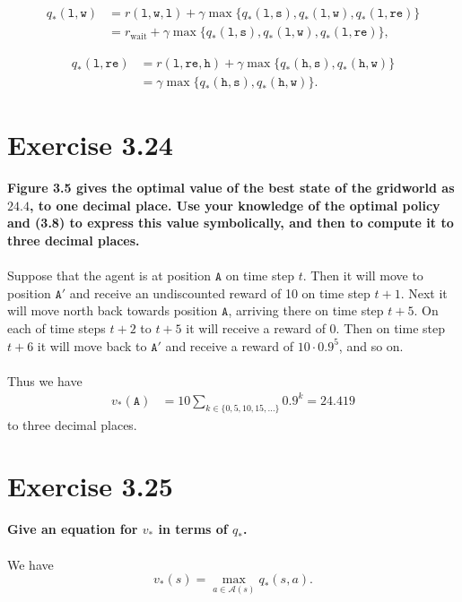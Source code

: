 \documentclass[a4paper,11pt]{article}
\numberwithin{equation}{section}
\theoremstyle{remark}
\begin{document}
\begin{align*}
	q_*(\texttt{l}, \texttt{w}) & = r(\texttt{l}, \texttt{w}, \texttt{l}) + 
	\gamma \max\{ q_*(\texttt{l}, \texttt{s}), q_*(\texttt{l}, \texttt{w}), q_*(\texttt{l}, \texttt{re}) \}  \\
	& = r_{\text{wait}} + \gamma \max \{ q_*(\texttt{l}, \texttt{s}), q_*(\texttt{l}, \texttt{w}), q_*(\texttt{l}, \texttt{re}) \},
\end{align*}

\begin{align*}
	q_*(\texttt{l}, \texttt{re}) & = r(\texttt{l}, \texttt{re}, \texttt{h}) + 
	\gamma \max\{ q_*(\texttt{h}, \texttt{s}), q_*(\texttt{h}, \texttt{w}) \}  \\
	& = \gamma \max \{ q_*(\texttt{h}, \texttt{s}), q_*(\texttt{h}, \texttt{w}) \}.
\end{align*}

\section{Exercise 3.24} 

\textbf{Figure 3.5 gives the optimal value of the best state of the gridworld as $24.4$, to one decimal place. Use your knowledge of the optimal policy and (3.8) to express this value symbolically, and then to compute it to three decimal places.}
\\ \\
Suppose that the agent is at position $\texttt{A}$ on time step $t$. Then it will move to position $\texttt{A}'$ and receive an undiscounted reward of 10 on time step $t+1$. Next it will move north back towards position $\texttt{A}$, arriving there on time step $t+5$. On each of time steps $t+2$ to $t+5$ it will receive a reward of 0. Then on time step $t+6$ it will move back to $\texttt{A}'$ and receive a reward of $10 \cdot 0.9^5$, and so on.  
\\ \\ 
Thus we have
\begin{align*}
	v_*(\texttt{A}) & = 10 \sum_{k \in \{0, 5, 10, 15, \dots\}}^{} 0.9^k = 24.419
\end{align*}
to three decimal places. 

\section{Exercise 3.25}

\textbf{Give an equation for $v_*$ in terms of $q_*$.}
\\ \\ 
We have 
\[
	v_*(s) = \max_{a \in \mathcal{A}(s)} q_*(s, a).	
\]
\end{document}
